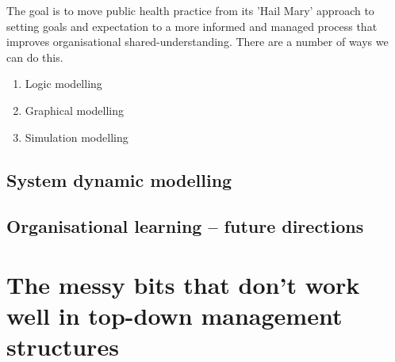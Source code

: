 The goal is to move public health practice from its 'Hail Mary' approach to setting goals and expectation to a more informed and managed process that improves organisational shared-understanding. There are a number of ways we can do this.
\begin{enumerate}
	\item Logic modelling
	\item Graphical modelling
	\item Simulation modelling
\end{enumerate}

\subsection{System dynamic modelling}

\subsection{Organisational learning -- future directions}


\section{The messy bits that don't work well in top-down management structures}

